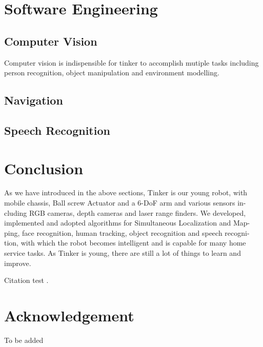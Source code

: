\documentclass[journal,12pt,onecolumn]{IEEEtran}
\begin{document}
\section{Software Engineering}
\subsection{Computer Vision}
Computer vision is indispensible for tinker to accomplish mutiple tasks including person recognition, object manipulation and environment modelling.


\subsection{Navigation}


\subsection{Speech Recognition}




\section{Conclusion}

As we have introduced in the above sections, Tinker is our young robot, with mobile chassis, Ball screw Actuator and a 6-DoF arm and various sensors in- cluding RGB cameras, depth cameras and laser range finders. We developed, implemented and adopted algorithms for Simultaneous Localization and Map- ping, face recognition, human tracking, object recognition and speech recogni- tion, with which the robot becomes intelligent and is capable for many home service tasks. As Tinker is young, there are still a lot of things to learn and improve.

Citation test \cite{xia2015human}.

\section*{Acknowledgement}
To be added



\end{document}
